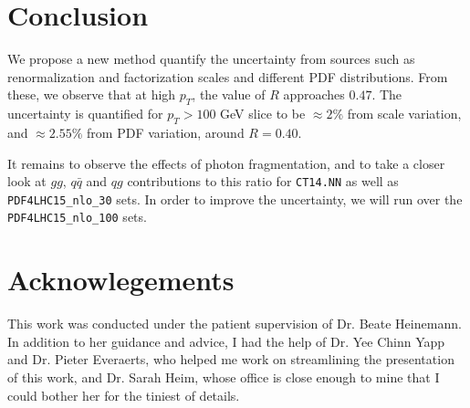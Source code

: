 \documentclass[11pt,a4paper,final]{report}
\begin{document}
\section{Conclusion}
We propose a new method quantify the uncertainty from sources such as renormalization and factorization scales and different PDF distributions. From these, we observe that at high $p_T$, the value of $R$ approaches $0.47$. The uncertainty is quantified for $p_T > 100$ GeV slice to be $\approx 2\%$ from scale variation, and $\approx 2.55\%$ from PDF variation, around $R = 0.40$.

It remains to observe the effects of photon fragmentation, and to take a closer look at $gg$, $q\bar{q}$ and $qg$ contributions to this ratio for \texttt{CT14.NN} as well as \texttt{PDF4LHC15\_nlo\_30} sets. In order to improve the uncertainty, we will run over the \texttt{PDF4LHC15\_nlo\_100} sets.

\section*{Acknowlegements}
This work was conducted under the patient supervision of Dr. Beate Heinemann. In addition to her guidance and advice, I had the help of Dr. Yee Chinn Yapp and Dr. Pieter Everaerts, who helped me work on streamlining the presentation of this work, and Dr. Sarah Heim, whose office is close enough to mine that I could bother her for the tiniest of details.
\end{document}
